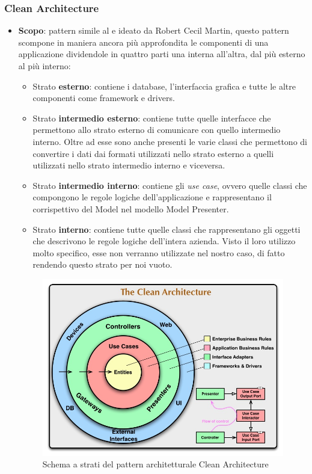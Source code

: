 \subsubsection{Clean Architecture}
\begin{itemize}
	\item \textbf{Scopo}: pattern simile al  e ideato da Robert Cecil Martin, questo pattern scompone in maniera ancora più approfondita le componenti di una applicazione dividendole in quattro parti una interna all'altra, dal più esterno al più interno:
	\begin{itemize}
	  	\item Strato \textbf{esterno}: contiene i database, l'interfaccia grafica e tutte le altre componenti come framework e drivers.
	  	\item Strato \textbf{intermedio esterno}: contiene tutte quelle interfacce che permettono allo strato esterno di comunicare con quello intermedio interno. Oltre ad esse sono anche presenti le varie classi che permettono di convertire i dati dai formati utilizzati nello strato esterno a quelli utilizzati nello strato intermedio interno e viceversa.
	  	\item Strato \textbf{intermedio interno}: contiene gli \textit{use case}, ovvero quelle classi che compongono le regole logiche dell'applicazione e rappresentano il corrispettivo del Model nel modello Model  Presenter.
	  	\item Strato \textbf{interno}: contiene tutte quelle classi che rappresentano gli oggetti che descrivono le regole logiche dell'intera azienda. Visto il loro utilizzo molto specifico, esse non verranno utilizzate nel nostro caso, di fatto rendendo questo strato per noi vuoto.
	\end{itemize}
	\begin{figure}[H]
	\centering
	\includegraphics[scale=0.3]{Sezioni/DesignPatterns/CleanArchitecture.jpg}
	\caption{Schema a strati del pattern architetturale Clean Architecture}
	\end{figure}
	

\end{itemize}
